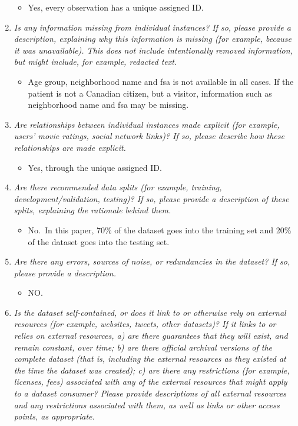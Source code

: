\documentclass[
]{article}
\providecommand{\tightlist}{%
  \setlength{\itemsep}{0pt}\setlength{\parskip}{0pt}}
\begin{document}
\begin{enumerate}
  \begin{itemize}
  \tightlist
  \item
    Yes, every observation has a unique assigned ID.
  \end{itemize}
\item
  \emph{Is any information missing from individual instances? If so, please provide a description, explaining why this information is missing (for example, because it was unavailable). This does not include intentionally removed information, but might include, for example, redacted text.}

  \begin{itemize}
  \tightlist
  \item
    Age group, neighborhood name and fsa is not available in all cases. If the patient is not a Canadian citizen, but a visitor, information such as neighborhood name and fsa may be missing.
  \end{itemize}
\item
  \emph{Are relationships between individual instances made explicit (for example, users' movie ratings, social network links)? If so, please describe how these relationships are made explicit.}

  \begin{itemize}
  \tightlist
  \item
    Yes, through the unique assigned ID.
  \end{itemize}
\item
  \emph{Are there recommended data splits (for example, training, development/validation, testing)? If so, please provide a description of these splits, explaining the rationale behind them.}

  \begin{itemize}
  \tightlist
  \item
    No.~In this paper, 70\% of the dataset goes into the training set and 20\% of the dataset goes into the testing set.
  \end{itemize}
\item
  \emph{Are there any errors, sources of noise, or redundancies in the dataset? If so, please provide a description.}

  \begin{itemize}
  \tightlist
  \item
    NO.
  \end{itemize}
\item
  \emph{Is the dataset self-contained, or does it link to or otherwise rely on external resources (for example, websites, tweets, other datasets)? If it links to or relies on external resources, a) are there guarantees that they will exist, and remain constant, over time; b) are there official archival versions of the complete dataset (that is, including the external resources as they existed at the time the dataset was created); c) are there any restrictions (for example, licenses, fees) associated with any of the external resources that might apply to a dataset consumer? Please provide descriptions of all external resources and any restrictions associated with them, as well as links or other access points, as appropriate.}


\end{enumerate}
\end{document}
